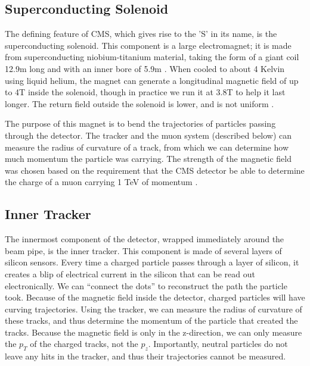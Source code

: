

\subsection{Superconducting Solenoid}
\label{ssec:cms:components:magnet}

The defining feature of CMS, which gives rise to the 'S' in its name,
is the superconducting solenoid. This component is a large
electromagnet; it is made from superconducting niobium-titanium
material, taking the form of a giant coil 12.9m long and with an inner
bore of 5.9m \cite{tdr}. When cooled to about 4 Kelvin using liquid helium,
the magnet can generate a longitudinal magnetic
field of up to 4T inside the solenoid, though in practice we run it at
3.8T to help it last longer. The return field outside the
solenoid is lower, and is not uniform \cite{accelexper}.

The purpose of this magnet is to bend the trajectories of particles
passing through the detector. The tracker and the muon system
(described below) can measure the radius of curvature of a track, from
which we can determine how much momentum the particle was
carrying. The strength of the magnetic field was chosen based on
the requirement that the CMS detector be able to determine the charge
of a muon carrying 1 TeV of momentum \cite{tdr}.

\subsection{Inner Tracker}
\label{ssec:cms:components:tracker}

The innermost component of the detector, wrapped immediately around
the beam pipe, is the inner tracker. This component is made of several
layers of silicon sensors. Every time a charged
particle passes through a layer of silicon, it creates a blip of
electrical current in the silicon that can be read out
electronically. We can ``connect the dots'' to reconstruct the path
the particle took. Because of the magnetic field inside the detector,
charged particles will have curving trajectories. Using the tracker,
we can measure the radius of curvature of these tracks, and thus
determine the momentum of the particle that created the
tracks. Because the magnetic field is only in the z-direction, we can
only measure the $p_T$ of the charged tracks, not the
$p_z$. Importantly, neutral particles do not leave any hits in the
tracker, and thus their trajectories cannot be measured.

